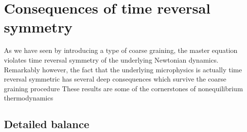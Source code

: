 \documentclass[
  letterpaper,
  enabledeprecatedfontcommands]{report}
\newenvironment{Shaded}{\begin{snugshade}}{\end{snugshade}}
\newcommand{\BuiltInTok}[1]{\textcolor[rgb]{0.00,0.23,0.31}{#1}}
\newcommand{\CommentTok}[1]{\textcolor[rgb]{0.37,0.37,0.37}{#1}}
\newcommand{\ControlFlowTok}[1]{\textcolor[rgb]{0.00,0.23,0.31}{\textbf{#1}}}
\newcommand{\DecValTok}[1]{\textcolor[rgb]{0.68,0.00,0.00}{#1}}
\newcommand{\NormalTok}[1]{\textcolor[rgb]{0.00,0.23,0.31}{#1}}
\newcommand{\OperatorTok}[1]{\textcolor[rgb]{0.37,0.37,0.37}{#1}}
\newcommand{\StringTok}[1]{\textcolor[rgb]{0.13,0.47,0.30}{#1}}
\newcommand{\VariableTok}[1]{\textcolor[rgb]{0.07,0.07,0.07}{#1}}
\newcommand{\VerbatimStringTok}[1]{\textcolor[rgb]{0.13,0.47,0.30}{#1}}
\begin{document}
\begin{Shaded}
\end{Shaded}

\section{Consequences of time reversal
symmetry}\label{consequences-of-time-reversal-symmetry}

As we have seen by introducing a type of coarse graining, the master
equation violates time reversal symmetry of the underlying Newtonian
dynamics. Remarkably however, the fact that the underlying microphysics
is actually time reversal symmetric has several deep consequences which
survive the coarse graining procedure These results are some of the
cornerstones of nonequilibrium thermodynamics

\subsection{Detailed balance}\label{detailed-balance}
\end{document}
